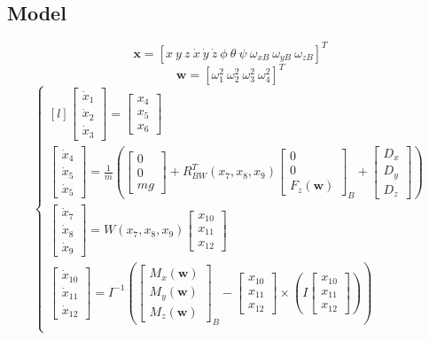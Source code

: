 \documentclass[a4paper, 12pt]{report}
\begin{document}
\subsection{Model}
 \[ \boldsymbol{x} =  [x \ y \ z \ \dot x \ \dot y \ \dot z \ \phi \ \theta \ \psi \ \omega_{xB} \ \omega_{yB} \ \omega_{zB}]^T \]
 \[ \boldsymbol{w} = [\omega^2_1 \  \omega^2_2 \  \omega^2_3 \  \omega^2_4]^T \]
\[\left\{ \begin{matrix}[l]
\begin{bmatrix} \dot x_{1}\\\dot x_{2} \\ \dot x_{3} \end{bmatrix} = \begin{bmatrix}  x_{4}\\ x_{5} \\ x_{6} \end{bmatrix}\\
\begin{bmatrix} \dot x_{4}\\\dot x_{5} \\ \dot x_{5} \end{bmatrix} = \frac{1}{m}(\begin{bmatrix}  0\\ 0\\ mg \end{bmatrix} + R_{BW}^T(x_7, x_8, x_9) \begin{bmatrix}  0\\ 0\\ F_{z}(\boldsymbol{w}) \end{bmatrix}_B + \begin{bmatrix}  D_x\\ D_y\\ D_z \end{bmatrix})\\
\begin{bmatrix} \dot x_{7}\\\dot x_{8} \\ \dot x_{9} \end{bmatrix} = W(x_7, x_8, x_9)\begin{bmatrix}  x_{10}\\ x_{11} \\ x_{12} \end{bmatrix} \\
\begin{bmatrix} \dot x_{10}\\\dot x_{11} \\ \dot x_{12} \end{bmatrix} = I^{-1}(\begin{bmatrix}  M_{x}(\boldsymbol{w})\\ M_{y}(\boldsymbol{w})\\ M_{z}(\boldsymbol{w}) \end{bmatrix}_B - \begin{bmatrix}  x_{10}\\ x_{11} \\ x_{12} \end{bmatrix} \times (I\begin{bmatrix}  x_{10}\\ x_{11} \\ x_{12} \end{bmatrix}))\\

\end{matrix}\]
\end{document}
